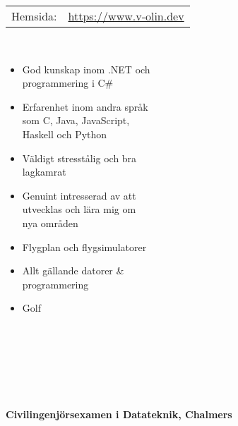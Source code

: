 \documentclass[11pt,oneside,a4paper,titlepage]{article}
\begin{document}
\begin{tcolorbox}
\begin{minipage}[t]{8cm}
\begin{tcolorbox}[grow to left by=15pt,colframe=sup-lgray,colback=sup-lgray,sharp corners]
{\begin{tabular}{l l}
                    Hemsida: & \href{https://www.v-olin.dev}{https://www.v-olin.dev} \\
                \end{tabular} \\
                \begin{itemize}
                    \item{God kunskap inom .NET och\\programmering i C\#}
                    \item{Erfarenhet inom andra språk\\som C, Java, JavaScript,\\Haskell och Python}
                    \item{Väldigt stresstålig och bra\\lagkamrat}
                    \item{Genuint intresserad av att\\utvecklas och lära mig om\\nya områden}
                    \vspace*{10pt}
                \end{itemize}
                \begin{itemize}
                    \item{Flygplan och flygsimulatorer}
                    \item{Allt gällande datorer \& \\programmering}
                    \item{Golf\\\\\\\\\\}
                \end{itemize}
            }            
        \end{tcolorbox}
    \end{minipage}
    \begin{minipage}[t]{12cm}
        \vspace*{-18.2pt}
        \begin{tcolorbox}[grow to left by=-10pt,colframe=white,colback=white,sharp corners]
            {\selectfont
                \\
                \\\textbf{Civilingenjörsexamen i Datateknik, Chalmers} \\
}
\end{tcolorbox}
\end{minipage}
\end{tcolorbox}
\end{document}
